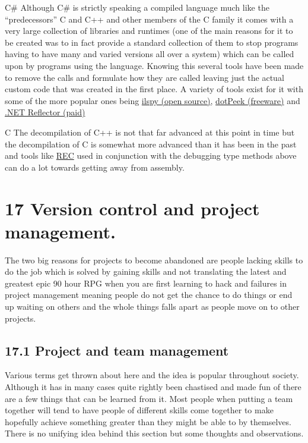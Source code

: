 \documentclass[
]{book}
\begin{document}
C\# Although C\# is strictly speaking a compiled language much like the ``predecessors'' C and C++ and other members of the C family it comes with a very large collection of libraries and runtimes (one of the main reasons for it to be created was to in fact provide a standard collection of them to stop programs having to have many and varied versions all over a system) which can be called upon by programs using the language. Knowing this several tools have been made to remove the calls and formulate how they are called leaving just the actual custom code that was created in the first place. A variety of tools exist for it with some of the more popular ones being \href{http://wiki.sharpdevelop.net/ilspy.ashx}{ilspy (open source)}, \href{http://www.jetbrains.com/decompiler/}{dotPeek (freeware)} and \href{http://www.reflector.net/}{.NET Reflector (paid)}

C The decompilation of C++ is not that far advanced at this point in time but the decompilation of C is somewhat more advanced than it has been in the past and tools like \href{http://www.backerstreet.com/rec/rec.htm}{REC} used in conjunction with the debugging type methods above can do a lot towards getting away from assembly.

\hypertarget{version-control-and-project-management.}{%
\chapter{17 Version control and project management.}\label{version-control-and-project-management.}}

The two big reasons for projects to become abandoned are people lacking skills to do the job which is solved by gaining skills and not translating the latest and greatest epic 90 hour RPG when you are first learning to hack and failures in project management meaning people do not get the chance to do things or end up waiting on others and the whole things falls apart as people move on to other projects.

\hypertarget{project-and-team-management}{%
\section{17.1 Project and team management}\label{project-and-team-management}}

Various terms get thrown about here and the idea is popular throughout society. Although it has in many cases quite rightly been chastised and made fun of there are a few things that can be learned from it. Most people when putting a team together will tend to have people of different skills come together to make hopefully achieve something greater than they might be able to by themselves. There is no unifying idea behind this section but some thoughts and observations.
\end{document}
